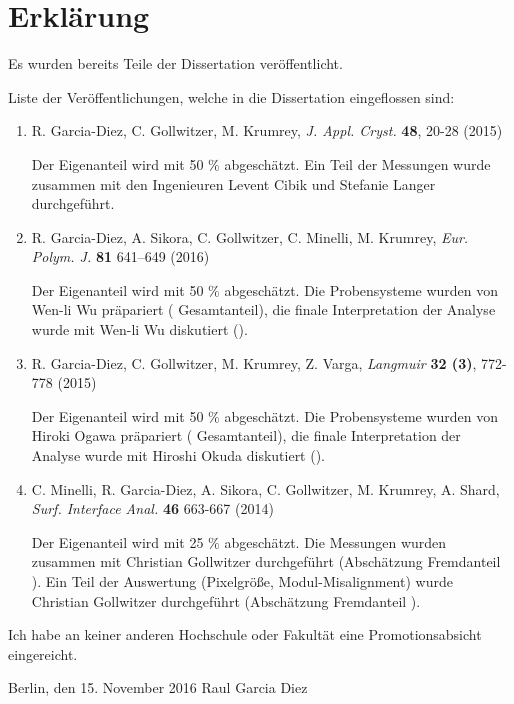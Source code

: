 \noindent
\pagestyle{empty}

\section*{Erklärung}

Es wurden bereits Teile der Dissertation veröffentlicht.
\vspace{2ex}

Liste der Veröffentlichungen, welche in die Dissertation eingeflossen sind:

\begin{enumerate}

    \item R. Garcia-Diez, C. Gollwitzer, M. Krumrey, \emph{J. Appl. Cryst.} \textbf{48}, 20-28 (2015)

        Der Eigenanteil wird mit 50 $\%$ abgeschätzt.
        Ein Teil der Messungen wurde zusammen mit den Ingenieuren Levent Cibik und Stefanie Langer durchgeführt.

    \item R. Garcia-Diez, A. Sikora, C. Gollwitzer, C. Minelli, M. Krumrey, \emph{Eur. Polym. J.} \textbf{81} 641–649 (2016) 

        Der Eigenanteil wird mit 50 $\%$ abgeschätzt.
        Die Probensysteme wurden von Wen-li Wu präpariert ( Gesamtanteil), die finale Interpretation der Analyse wurde mit Wen-li Wu diskutiert ().

    \item R. Garcia-Diez, C. Gollwitzer, M. Krumrey, Z. Varga, \emph{Langmuir} \textbf{32 (3)}, 772-778 (2015)

        Der Eigenanteil wird mit 50 $\%$ abgeschätzt.
        Die Probensysteme wurden von Hiroki Ogawa präpariert ( Gesamtanteil), die finale Interpretation der Analyse wurde mit Hiroshi Okuda diskutiert ().

    \item C. Minelli, R. Garcia-Diez, A. Sikora, C. Gollwitzer, M. Krumrey, A. Shard, \emph{Surf. Interface Anal.} \textbf{46} 663-667 (2014)

        Der Eigenanteil wird mit 25 $\%$ abgeschätzt.
        Die Messungen wurden zusammen mit Christian Gollwitzer durchgeführt (Abschätzung Fremdanteil ).
        Ein Teil der Auswertung (Pixelgröße, Modul-Misalignment) wurde Christian Gollwitzer durchgeführt (Abschätzung Fremdanteil ).

\end{enumerate}


Ich habe an keiner anderen Hochschule oder Fakultät eine Promotionsabsicht eingereicht.

\vspace{3cm}

\noindent Berlin, den 15. November 2016 \hfill Raul Garcia Diez

\cleardoublepage
